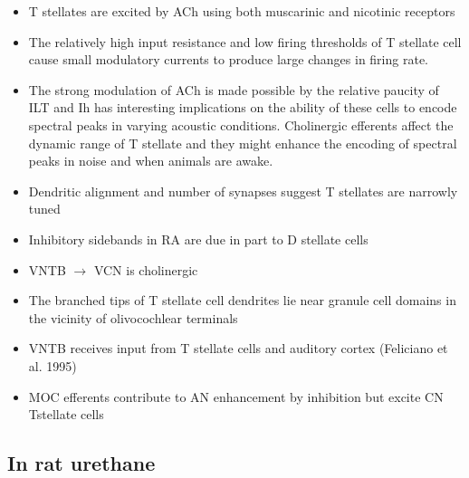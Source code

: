 \documentclass[10pt,a4paper]{article}
\begin{document}
\begin{itemize}
\item T stellates are excited by ACh using both muscarinic and nicotinic
  receptors
\item The relatively high input resistance and low firing thresholds of T
  stellate cell cause small modulatory currents to produce large changes in
  firing rate.
\item The strong modulation of ACh is made possible by the relative paucity of
  ILT and Ih has interesting implications on the ability of these cells to
  encode spectral peaks in varying acoustic conditions.  Cholinergic efferents
  affect the dynamic range of T stellate and they might enhance the encoding of
  spectral peaks in noise and when animals are awake.
\item Dendritic alignment and number of synapses suggest T stellates are
  narrowly tuned
\item Inhibitory sidebands in RA are due in part to D stellate cells
\item VNTB \ensuremath{\rightarrow} VCN is cholinergic  \citep{SherriffHenderson:1994}
\item The branched tips of T stellate cell dendrites lie near granule cell
  domains in the vicinity of olivocochlear terminals
  \citep{OertelFujino:2001,OertelWuEtAl:1990}
\item VNTB receives input from T stellate cells
  \citep{SmithJorisEtAl:1993,ThompsonThompson:1991} and auditory cortex
  (Feliciano et al. 1995)
\item MOC efferents contribute to AN enhancement by inhibition but excite CN
  Tstellate cells
\end{itemize}
\subsection{In rat urethane \citep{EbertOstwald:1995}}
\end{document}
